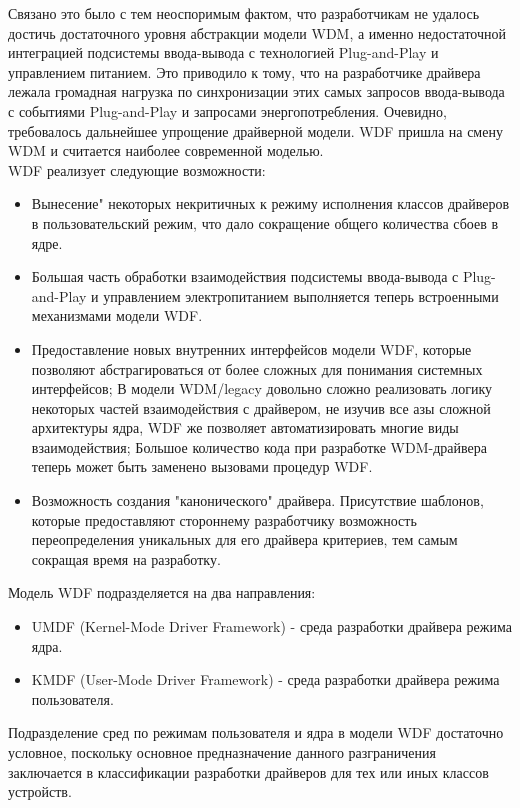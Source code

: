 \documentclass[14pt,a4paper]{article}
\begin{document}
\par Связано это было с тем неоспоримым фактом, что разработчикам не удалось достичь достаточного уровня абстракции модели WDM, а именно недостаточной интеграцией подсистемы ввода-вывода с технологией Plug-and-Play и управлением питанием. Это приводило к тому, что на разработчике драйвера лежала громадная нагрузка по синхронизации этих самых запросов ввода-вывода с событиями Plug-and-Play и запросами энергопотребления. Очевидно, требовалось дальнейшее упрощение драйверной модели. WDF пришла на смену WDM и считается наиболее современной моделью.\\
WDF реализует следующие возможности:
\begin{itemize}
\item Вынесение" некоторых некритичных к режиму исполнения классов драйверов в пользовательский режим, что дало сокращение общего количества сбоев в ядре.
\item Большая часть обработки взаимодействия подсистемы ввода-вывода с Plug-and-Play и управлением электропитанием выполняется теперь встроенными механизмами модели WDF.
\item Предоставление новых внутренних интерфейсов модели WDF, которые позволяют абстрагироваться от более сложных для понимания системных интерфейсов; В модели WDM/legacy довольно сложно реализовать логику некоторых частей взаимодействия с драйвером, не изучив все азы сложной архитектуры ядра, WDF же позволяет автоматизировать многие виды взаимодействия; Большое количество кода при разработке WDM-драйвера теперь может быть заменено вызовами процедур WDF.
\item Возможность создания "канонического" драйвера. Присутствие шаблонов, которые предоставляют стороннему разработчику возможность переопределения уникальных для его драйвера критериев, тем самым сокращая время на разработку.
\end{itemize}

Модель WDF подразделяется на два направления:
\begin{itemize}
\item UMDF (Kernel-Mode Driver Framework) - среда разработки драйвера режима ядра.
\item KMDF (User-Mode Driver Framework) - среда разработки драйвера режима пользователя.
\end{itemize}

Подразделение сред по режимам пользователя и ядра в модели WDF достаточно условное, поскольку основное предназначение данного разграничения заключается в классификации разработки драйверов для тех или иных классов устройств.\\
\end{document}
